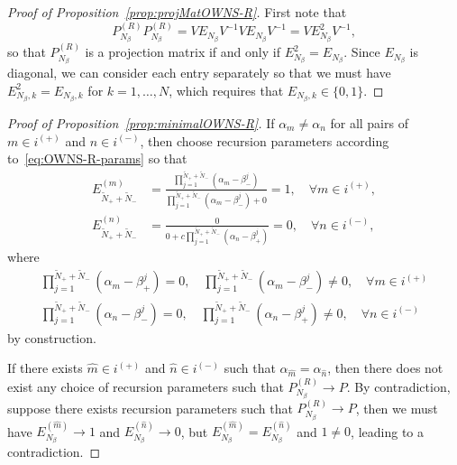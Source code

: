 \begin{proof}[Proof of Proposition~\ref{prop:projMatOWNS-R}]
    First note that
    \[
    P^{(R)}_{N_{\beta}}
    P^{(R)}_{N_{\beta}}
    =VE_{N_\beta}V^{-1}VE_{N_\beta}V^{-1}
    =VE^2_{N_\beta}V^{-1},
    \]
    so that $P_{N_\beta}^{(R)}$ is a projection matrix if and only if $E_{N_\beta}^2=E_{N_\beta}$. Since $E_{N_\beta}$ is diagonal, we can consider each entry separately so that we must have $E_{N_\beta,k}^2=E_{N_\beta,k}$ for $k=1,\dots,N$, which requires that $E_{N_\beta,k}\in\{0,1\}$.
\end{proof}

\begin{proof}[Proof of Proposition~\ref{prop:minimalOWNS-R}]
    If $\alpha_m\neq\alpha_n$ for all pairs of $m\in i^{(+)}$ and $n\in i^{(-)}$, then choose recursion parameters according to~\eqref{eq:OWNS-R-params} so that
    \begin{align*}
    E_{\tilde{N}_++\tilde{N}_-}^{(m)}
    &=\frac{\prod_{j=1}^{\tilde{N}_++\tilde{N}_-}(\alpha_m-\beta_-^j)}{\prod_{j=1}^{\tilde{N}_++\tilde{N}_-}(\alpha_m-\beta_-^j)+0}
    =1,\quad \forall m\in i^{(+)},\\
    E_{\tilde{N}_++\tilde{N}_-}^{(n)}
    &=\frac{0}{0+c\prod_{j=1}^{\tilde{N}_++\tilde{N}_-}(\alpha_n-\beta_+^j)}
    =0,\quad \forall n\in i^{(-)},
    \end{align*}
    where
    \begin{align*}
        \prod_{j=1}^{\tilde{N}_++\tilde{N}_-}(\alpha_m-\beta_+^j)=0,\quad
        \prod_{j=1}^{\tilde{N}_++\tilde{N}_-}(\alpha_m-\beta_-^j)\neq0,\quad\forall m\in i^{(+)}\\
        \prod_{j=1}^{\tilde{N}_++\tilde{N}_-}(\alpha_n-\beta_-^j)=0,\quad
        \prod_{j=1}^{\tilde{N}_++\tilde{N}_-}(\alpha_n-\beta_+^j)\neq0,\quad\forall n\in i^{(-)}
    \end{align*}
    by construction.
    
    If there exists $\hat{m}\in i^{(+)}$ and $\hat{n}\in i^{(-)}$ such that $\alpha_{\hat{m}}=\alpha_{\hat{n}}$, then there does not exist any choice of recursion parameters such that $P_{N_\beta}^{(R)}\to P$. By contradiction, suppose there exists recursion parameters such that $P_{N_\beta}^{(R)}\to P$, then we must have $E_{N_\beta}^{(\hat{m})}\to1$ and $E_{N_\beta}^{(\hat{n})}\to0$, but $E_{N_\beta}^{(\hat{m})}=E_{N_\beta}^{(\hat{n})}$ and $1\neq0$, leading to a contradiction.
\end{proof}

